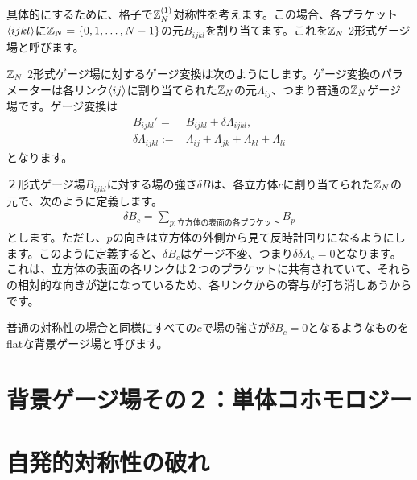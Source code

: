 \documentclass[generalized_symmetry.tex]{subfiles}
\begin{document}
具体的にするために、格子で$\mathbb{Z}_N^{(1)}$対称性を考えます。この場合、各プラケット$\expval{ijkl}$に$\mathbb{Z}_N=\{0,1,\dots,N-1\}$の元$B_{ijkl}$を割り当てます。これを$\mathbb{Z}_N$ 2形式ゲージ場と呼びます。

$\mathbb{Z}_N$ 2形式ゲージ場に対するゲージ変換は次のようにします。ゲージ変換のパラメーターは各リンク$\expval{ij}$に割り当てられた$\mathbb{Z}_N$の元$\Lambda_{ij}$、つまり普通の$\mathbb{Z}_N$ゲージ場です。ゲージ変換は
\begin{align}
    B_{ijkl}' =& B_{ijkl} + \delta \Lambda_{ijkl},\\
    \delta \Lambda_{ijkl}:=&\Lambda_{ij} + \Lambda_{jk} + \Lambda_{kl} + \Lambda_{li}
\end{align}
となります。

２形式ゲージ場$B_{ijkl}$に対する場の強さ$\delta B$は、各立方体$c$に割り当てられた$\mathbb{Z}_N$の元で、次のように定義します。
\begin{align}
    \delta B_c = \sum_{p:\text{立方体の表面の各プラケット}} B_{p}
\end{align}
とします。ただし、$p$の向きは立方体の外側から見て反時計回りになるようにします。このように定義すると、$\delta B_c$はゲージ不変、つまり$\delta \delta \Lambda_c =0$となります。これは、立方体の表面の各リンクは２つのプラケットに共有されていて、それらの相対的な向きが逆になっているため、各リンクからの寄与が打ち消しあうからです。

普通の対称性の場合と同様にすべての$c$で場の強さが$\delta B_c=0$となるようなものをflatな背景ゲージ場と呼びます。


\section{背景ゲージ場その２：単体コホモロジー}
\section{自発的対称性の破れ}
\end{document}
